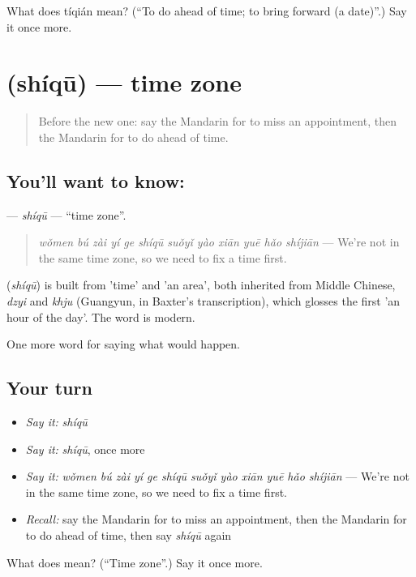 \begin{tcolorbox}[breakable,colback=teal!4,colframe=teal!35!black,title={Before you move on}]
What does tíqián mean? (\textquotedblleft{}To do ahead of time; to bring forward (a date)\textquotedblright{}.) Say it once more.
\end{tcolorbox}
\section[\texorpdfstring{\zh{时区} (shíqū)}{时区 (shíqū)}]{ (shíqū) — time zone}

\label{lesson:ZH-C388-shiqu}



\begin{quote}
Before the new one: say the Mandarin for to miss an appointment, then the Mandarin for to do ahead of time.
\end{quote}

\subsection*{You'll want to know: }
\textbf{} — \emph{shíqū} — \textquotedblleft{}time zone\textquotedblright{}.

\begin{quote}
\textbf{} \emph{wǒmen bú zài yí ge shíqū suǒyǐ yào xiān yuē hǎo shíjiān} — We're not in the same time zone, so we need to fix a time first.
\end{quote}

\begin{cousinweb}
\textbf{} (\emph{shíqū}) is built from  'time' and  'an area', both inherited from Middle Chinese, \emph{dzyi} and \emph{khju} (Guangyun, in Baxter's transcription), which glosses the first 'an hour of the day'. The word is modern.
\end{cousinweb}

\begin{grammarlens}[title={What you've built}]
One more word for saying what would happen.
\end{grammarlens}

\subsection*{Your turn}
\begin{itemize}
\raggedright
  \item \emph{Say it:} \emph{shíqū}
  \item \emph{Say it:} \emph{shíqū}, once more
  \item \emph{Say it:} \emph{wǒmen bú zài yí ge shíqū suǒyǐ yào xiān yuē hǎo shíjiān} — We're not in the same time zone, so we need to fix a time first.
  \item \emph{Recall:} say the Mandarin for to miss an appointment, then the Mandarin for to do ahead of time, then say \emph{shíqū} again
\end{itemize}

\begin{tcolorbox}[breakable,colback=teal!4,colframe=teal!35!black,title={Before you move on}]
What does  mean? (\textquotedblleft{}Time zone\textquotedblright{}.) Say it once more.
\end{tcolorbox}

